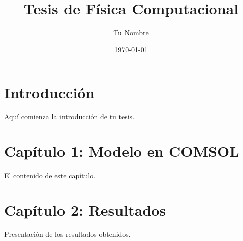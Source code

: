 \documentclass[12pt]{report}
\begin{document}
\title{Tesis de Física Computacional}
\author{Tu Nombre}
\date{\today}
\maketitle

\chapter{Introducción}
Aquí comienza la introducción de tu tesis.

\chapter{Capítulo 1: Modelo en COMSOL}
El contenido de este capítulo.

\chapter{Capítulo 2: Resultados}
Presentación de los resultados obtenidos.



\end{document}

